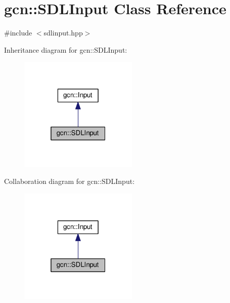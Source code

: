 \hypertarget{classgcn_1_1SDLInput}{}\section{gcn\+:\+:S\+D\+L\+Input Class Reference}
\label{classgcn_1_1SDLInput}


{\ttfamily \#include $<$sdlinput.\+hpp$>$}



Inheritance diagram for gcn\+:\+:S\+D\+L\+Input\+:\nopagebreak
\begin{figure}[H]
\begin{center}
\leavevmode
\includegraphics[width=160pt]{classgcn_1_1SDLInput__inherit__graph}
\end{center}
\end{figure}


Collaboration diagram for gcn\+:\+:S\+D\+L\+Input\+:\nopagebreak
\begin{figure}[H]
\begin{center}
\leavevmode
\includegraphics[width=160pt]{classgcn_1_1SDLInput__coll__graph}
\end{center}
\end{figure}

